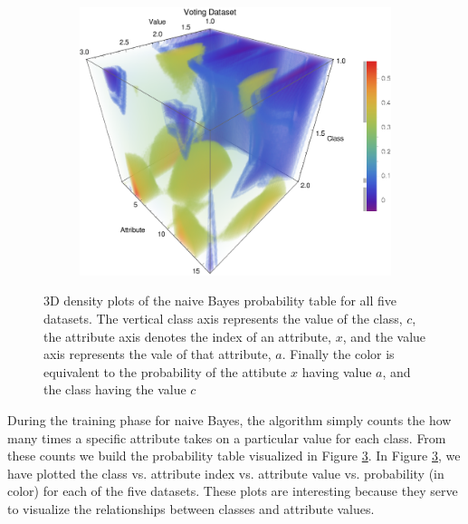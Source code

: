 \documentclass{article}
\begin{document}
\begin{figure}[h!]
\begin{subfigure}[b]{0.32\textwidth}
				\caption{}
				\label{p_soybean}				
			\end{subfigure} \	
			\begin{subfigure}[b]{0.32\textwidth}
				\centering
				\includegraphics[width=\textwidth]{figs/NaiveBayes/plot_ptable_vote}	
				\caption{}
				\label{p_vote}				
			\end{subfigure}
			\caption{3D density plots of the naive Bayes probability table for all five datasets. The vertical class axis represents the value of the class, $c$, the attribute axis denotes the index of an attribute, $x$, and the value axis represents the vale of that attribute, $a$. Finally the color is equivalent to the probability of the attibute $x$ having value $a$, and the class having the value $c$}
			\label{ptable}
		\end{figure}
			
		During the training phase for naive Bayes, the algorithm simply counts the how many times a specific attribute takes on a particular value for each class. 
		From these counts we build the probability table visualized in Figure \ref{ptable}. 
		In Figure \ref{ptable}, we have plotted the class vs. attribute index vs. attribute value vs. probability (in color) for each of the five datasets. 
		These plots are interesting because they serve to visualize the relationships between classes and attribute values. 
			
\end{document}
